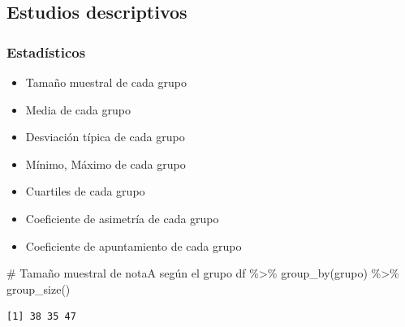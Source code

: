 \documentclass[
  a4paper,
]{scrreport}
\newenvironment{Shaded}{\begin{snugshade}}{\end{snugshade}}
\newcommand{\CommentTok}[1]{\textcolor[rgb]{0.37,0.37,0.37}{#1}}
\newcommand{\FunctionTok}[1]{\textcolor[rgb]{0.28,0.35,0.67}{#1}}
\newcommand{\NormalTok}[1]{\textcolor[rgb]{0.00,0.23,0.31}{#1}}
\newcommand{\SpecialCharTok}[1]{\textcolor[rgb]{0.37,0.37,0.37}{#1}}
\providecommand{\tightlist}{%
  \setlength{\itemsep}{0pt}\setlength{\parskip}{0pt}}\usepackage{longtable,booktabs,array}
\theoremstyle{definition}
\theoremstyle{definition}
\theoremstyle{remark}
\begin{document}
\subsection{Estudios descriptivos}\label{estudios-descriptivos-4}

\subsubsection{Estadísticos}\label{estaduxedsticos-4}

\begin{itemize}
\tightlist
\item
  Tamaño muestral de cada grupo
\item
  Media de cada grupo
\item
  Desviación típica de cada grupo
\item
  Mínimo, Máximo de cada grupo
\item
  Cuartiles de cada grupo
\item
  Coeficiente de asimetría de cada grupo
\item
  Coeficiente de apuntamiento de cada grupo
\end{itemize}

\begin{Shaded}
\begin{Highlighting}[]
\CommentTok{\# Tamaño muestral de notaA según el grupo}
\NormalTok{df }\SpecialCharTok{\%\textgreater{}\%} \FunctionTok{group\_by}\NormalTok{(grupo) }\SpecialCharTok{\%\textgreater{}\%} \FunctionTok{group\_size}\NormalTok{()}
\end{Highlighting}
\end{Shaded}

\begin{verbatim}
[1] 38 35 47
\end{verbatim}
\end{document}
